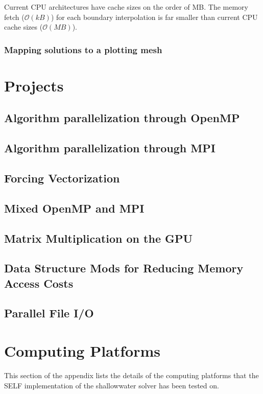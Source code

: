 \documentclass{softwaremanual}
\begin{document}
 Current CPU architectures have cache sizes on the order of MB. The memory fetch ($\mathcal{O}(kB)$) for each boundary interpolation is far smaller than current CPU cache sizes ($\mathcal{O}(MB)$). 
 \subsection{Mapping solutions to a plotting mesh}

 
\chapter{Projects}
\section{Algorithm parallelization through OpenMP}

\section{Algorithm parallelization through MPI}

\section{Forcing Vectorization}

\section{Mixed OpenMP and MPI}

\section{Matrix Multiplication on the GPU}

\section{Data Structure Mods for Reducing Memory Access Costs}

\section{Parallel File I/O}



\clearpage

\appendix

\chapter{Computing Platforms}
 This section of the appendix lists the details of the computing platforms that the SELF implementation of the shallowwater solver has been tested on.
 
\end{document}
